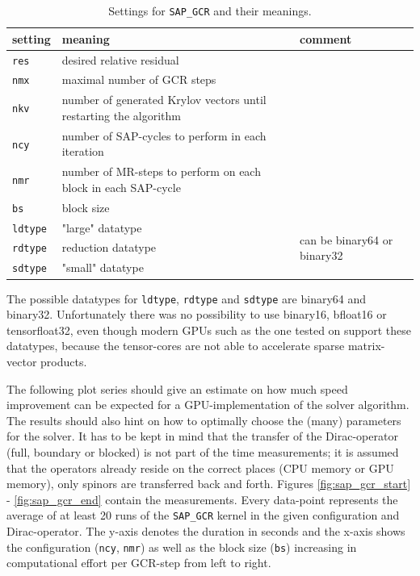 \documentclass{article}
\theoremstyle{plain} %
\theoremstyle{convention} %
\theoremstyle{remark} %
\def\code#1{\texttt{#1}}
\numberwithin{equation}{section}
\begin{document}
\begin{table}[H]
\centering
    \begin{tabular}{ |p{1.5cm}|p{6cm}|p{4.5cm}|  }
        \hline
        setting & meaning & comment \\
        \hline\hline
        \code{res}  & desired relative residual & \\
        \hline
        \code{nmx}  & maximal number of GCR steps & \\
        \hline
        \code{nkv}  & number of generated Krylov vectors until restarting the algorithm & \\
        \hline
        \code{ncy}  & number of SAP-cycles to perform in each iteration & \\
        \hline
        \code{nmr}  & number of MR-steps to perform on each block in each SAP-cycle & \\
        \hline
        \code{bs}   & block size & \\
        \hline
        \code{ldtype}  & "large" datatype & \multirow{3}{*}{can be binary64 or binary32}  \\
        \cline{0-1}
        \code{rdtype}  & reduction datatype & \\
        \cline{0-1}
        \code{sdtype}  & "small" datatype & \\
        \hline
    \end{tabular}
    \caption{Settings for \code{SAP\_GCR} and their meanings.}
    \label{tab:sap_gcr_settings}
\end{table}

The possible datatypes for \code{ldtype}, \code{rdtype} and \code{sdtype} are \gls{binary64} and \gls{binary32}. Unfortunately there was no possibility to use \gls{binary16}, \gls{bfloat16} or \gls{tensorfloat32}, even though modern GPUs such as the one tested on support these datatypes, because the tensor-cores are not able to accelerate sparse matrix-vector products.


The following plot series should give an estimate on how much speed improvement can be expected for a GPU-implementation of the solver algorithm. The results should also hint on how to optimally choose the (many) parameters for the solver. It has to be kept in mind that the transfer of the Dirac-operator (full, boundary or blocked) is not part of the time measurements; it is assumed that the operators already reside on the correct places (CPU memory or GPU memory), only spinors are transferred back and forth. Figures \ref{fig:sap_gcr_start} - \ref{fig:sap_gcr_end} contain the measurements. Every data-point represents the average of at least \num{20} runs of the \code{SAP\_GCR} kernel in the given configuration and Dirac-operator. The y-axis denotes the duration in seconds and the x-axis shows the configuration (\code{ncy}, \code{nmr}) as well as the block size (\code{bs}) increasing in computational effort per GCR-step from left to right.
\end{document}
